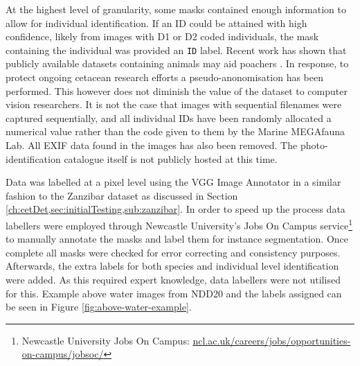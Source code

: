 At the highest level of granularity, some masks contained enough information to allow for individual identification. If an ID could be attained with high confidence, likely from images with D1 or D2 coded individuals, the mask containing the individual was provided an \texttt{ID} label. Recent work has shown that publicly available datasets containing animals may aid poachers \cite{beery_can_2021}. In response, to protect ongoing cetacean research efforts a pseudo-anonomisation has been performed. This however does not diminish the value of the dataset to computer vision researchers. It is not the case that images with sequential filenames were captured sequentially, and all individual IDs have been randomly allocated a numerical value rather than the code given to them by the Marine MEGAfauna Lab. All EXIF data found in the images has also been removed. The photo-identification catalogue itself is not publicly hosted at this time.

Data was labelled at a pixel level using the VGG Image Annotator \cite{dutta_via_2019} in a similar fashion to the Zanzibar dataset as discussed in Section \ref{ch:cetDet,sec:initialTesting,sub:zanzibar}. In order to speed up the process data labellers were employed through Newcastle University's Jobs On Campus service\footnote{Newcastle University Jobs On Campus: \href{https://www.ncl.ac.uk/careers/jobs/opportunities-on-campus/jobsoc/\#jobsocoverview}{ncl.ac.uk/careers/jobs/opportunities-on-campus/jobsoc/}} to manually annotate the masks and label them for instance segmentation. Once complete all masks were checked for error correcting and consistency purposes. Afterwards, the extra labels for both species and individual level identification were added. As this required expert knowledge, data labellers were not utilised for this. Example above water images from NDD20 and the labels assigned can be seen in Figure \ref{fig:above-water-example}.

